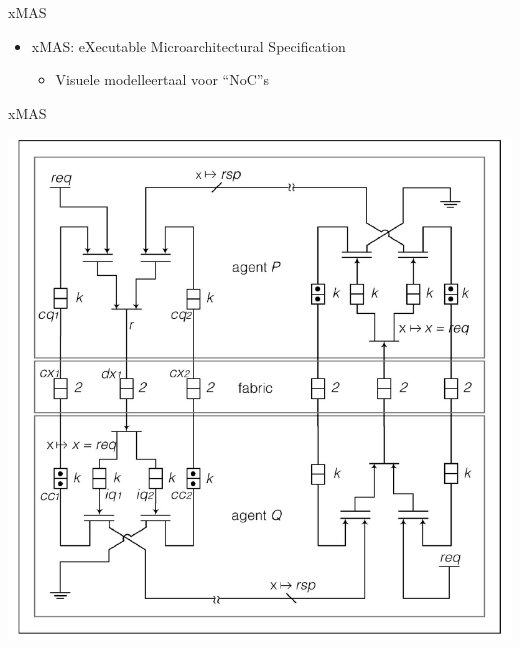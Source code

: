 \documentclass[10pt]{beamer}
\begin{document}
\begin{frame}[label=xMAS]{xMAS}
    \begin{itemize}
     \item xMAS: eXecutable Microarchitectural Specification
     \begin{itemize}
      \item Visuele modelleertaal voor ``NoC''s
     \end{itemize}
    \end{itemize}


\end{frame}

\begin{frame}{xMAS}

    \centering
    \includegraphics[width=0.75\textheight]{two-agents}

\end{frame}
\end{document}
